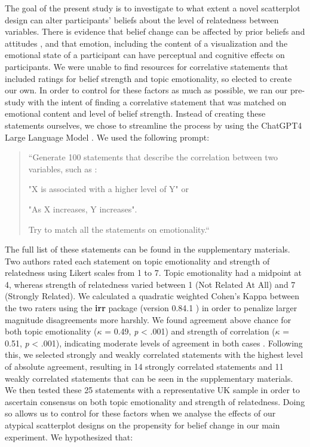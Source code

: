 \documentclass[manuscript,screen,review,anonymous]{acmart}
\begin{document}
The goal of the present study is to investigate to what extent a novel
scatterplot design can alter participants' beliefs about the level of
relatedness between variables. There is evidence that belief change can
be affected by prior beliefs and attitudes
\citep{xiong_2022, markant_2023}, and that emotion, including the
content of a visualization \citep{phelps_2006, harrison_2013} and the
emotional state of a participant \citep{thoresen_2016} can have
perceptual and cognitive effects on participants. We were unable to find
resources for correlative statements that included ratings for belief
strength and topic emotionality, so elected to create our own. In order
to control for these factors as much as possible, we ran our pre-study
with the intent of finding a correlative statement that was matched on
emotional content and level of belief strength. Instead of creating
these statements ourselves, we chose to streamline the process by using
the ChatGPT4 Large Language Model \citep{chat_gpt}. We used the
following prompt:

\begin{quotation}

    ``Generate 100 statements that describe the correlation between two variables, such as :

     "X is associated with a higher level of Y" or

     "As X increases, Y increases".

    Try to match all the statements on emotionality.``
    
\end{quotation}

The full list of these statements can be found in the supplementary
materials. Two authors rated each statement on topic emotionality and
strength of relatedness using Likert scales from 1 to 7. Topic
emotionality had a midpoint at 4, whereas strength of relatedness varied
between 1 (Not Related At All) and 7 (Strongly Related). We calculated a
quadratic weighted Cohen's Kappa between the two raters using the
\textbf{irr} package (version 0.84.1 \citep{irr}) in order to penalize
larger magnitude disagreements more harshly. We found agreement above
chance for both topic emotionality (\(\kappa\) = 0.49, \emph{p}
\textless{} .001) and strength of correlation (\(\kappa\) = 0.51,
\emph{p} \textless{} .001), indicating moderate levels of agreement in
both cases \citep{cohen_1968, fleiss_1969}. Following this, we selected
strongly and weakly correlated statements with the highest level of
absolute agreement, resulting in 14 strongly correlated statements and
11 weakly correlated statements that can be seen in the supplementary
materials. We then tested these 25 statements with a representative UK
sample in order to ascertain consensus on both topic emotionality and
strength of relatedness. Doing so allows us to control for these factors
when we analyse the effects of our atypical scatterplot designs on the
propensity for belief change in our main experiment. We hypothesized
that:
\end{document}

